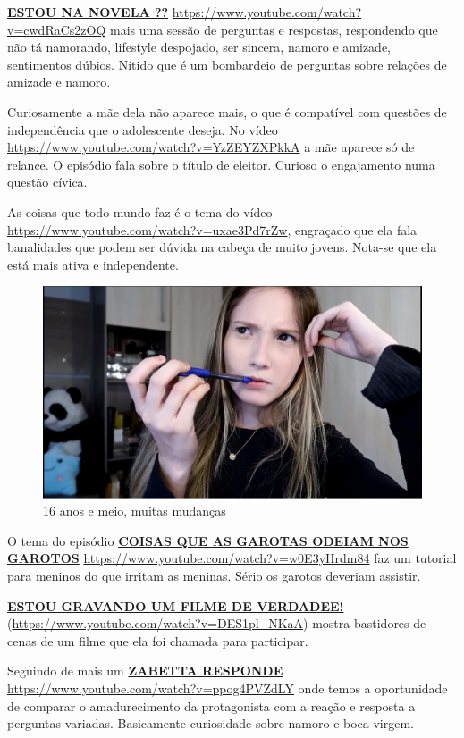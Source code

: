 \href{https://www.youtube.com/watch?v=cwdRaCs2zOQ}{\textbf{ESTOU NA NOVELA ??}} \url{https://www.youtube.com/watch?v=cwdRaCs2zOQ} mais uma sessão de perguntas e respostas, respondendo que não tá namorando, lifestyle despojado, ser sincera, namoro e amizade, sentimentos dúbios. Nítido que é um bombardeio de perguntas sobre relações de amizade e namoro.

Curiosamente a mãe dela não aparece mais, o que é compatível com questões de independência que o adolescente deseja. No vídeo \url{https://www.youtube.com/watch?v=YzZEYZXPkkA} a mãe aparece só de relance. O episódio fala sobre o título de eleitor. Curioso o engajamento numa questão cívica.

As coisas que todo mundo faz é o tema do vídeo \url{https://www.youtube.com/watch?v=uxae3Pd7rZw}, engraçado que ela fala banalidades que podem ser dúvida na cabeça de muito jovens. Nota-se que ela está mais ativa e independente.

\begin{figure}[h!]
    \centering
    \includegraphics[width=0.7\linewidth]{fig/Zabetta-16-anos2}
    \caption{16 anos e meio, muitas mudanças}
    \label{fig:zabetta-16-anos2}
\end{figure}

O tema do episódio \href{https://www.youtube.com/watch?v=w0E3yHrdm84}{\textbf{COISAS QUE AS GAROTAS ODEIAM NOS GAROTOS}} \url{https://www.youtube.com/watch?v=w0E3yHrdm84} faz um tutorial para meninos do que irritam as meninas. Sério os garotos deveriam assistir.

\href{https://www.youtube.com/watch?v=DES1pl_NKaA}{\textbf{ESTOU GRAVANDO UM FILME DE VERDADEE!}} (\url{https://www.youtube.com/watch?v=DES1pl_NKaA}) mostra bastidores de cenas de um filme que ela foi chamada para participar.

Seguindo de mais um \href{https://www.youtube.com/watch?v=ppog4PVZdLY}{\textbf{ZABETTA RESPONDE}} \url{https://www.youtube.com/watch?v=ppog4PVZdLY} onde temos a oportunidade de comparar o amadurecimento da protagonista com a reação e resposta a perguntas variadas. Basicamente curiosidade sobre namoro e boca virgem.


